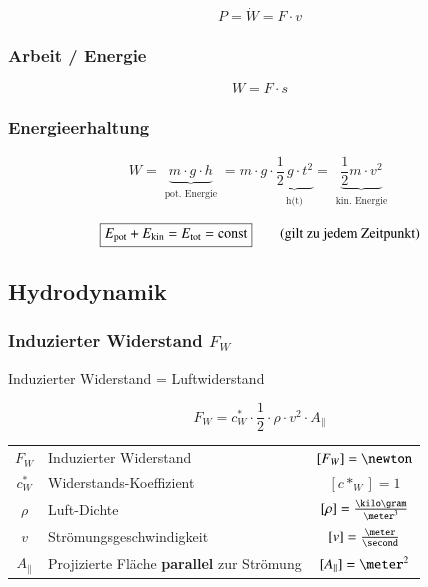 \vspace{-0.2cm}
$$ \boxed{ P = \dot{W} = F \cdot v } $$


\subsubsection{Arbeit / Energie}

\vspace{-0.2cm}
$$ \boxed{ W = F \cdot s } $$

\subsubsection{Energieerhaltung}

\vspace{-0.2cm}
$$ \boxed{ W = \underbrace{m \cdot g \cdot h}_{\substack{\text{pot. Energie}}} =  m \cdot g \cdot \underbrace{ \frac{1}{2} \, g \cdot t^2}_{\substack{\text{h(t)}}}  = \underbrace{ \frac{1}{2} m \cdot v^2 }_{\substack{\text{kin. Energie}}} } $$ 
\vspace{0.2cm}


$$ \boxed{ E_{\rm pot} + E_{\rm kin} = E_{\rm tot} = \mathrm{const}} \qquad \text{(gilt zu jedem Zeitpunkt)} $$


\subsection{Hydrodynamik}

\subsubsection{Induzierter Widerstand $F_W$}

Induzierter Widerstand = Luftwiderstand 

$$ \boxed{ F_W = c^*_W \cdot \frac{1}{2} \cdot \rho \cdot v^2 \cdot A_{\|} } $$

\renewcommand{\arraystretch}{1.3}
\begin{tabular}{c l c}
		$F_W$ 		& Induzierter Widerstand 								& $[F_W] = \newton$ 						\\
		$c^*_W$ 	& Widerstands-Koeffizient 								& $[c*_W] = 1$ 								\\
		$\rho$ 		& Luft-Dichte		 									& $[\rho] = \frac{\kilo \gram}{\meter^3}$ 	\\
		$v$ 		& Strömungsgeschwindigkeit 								& $[v] = \frac{\meter}{\second}$ 			\\
		$A_{\|}$ 	& Projizierte Fläche \textbf{parallel} zur Strömung 	& $[A_{\|}] = \meter^2$
\end{tabular}
\renewcommand{\arraystretch}{1}


